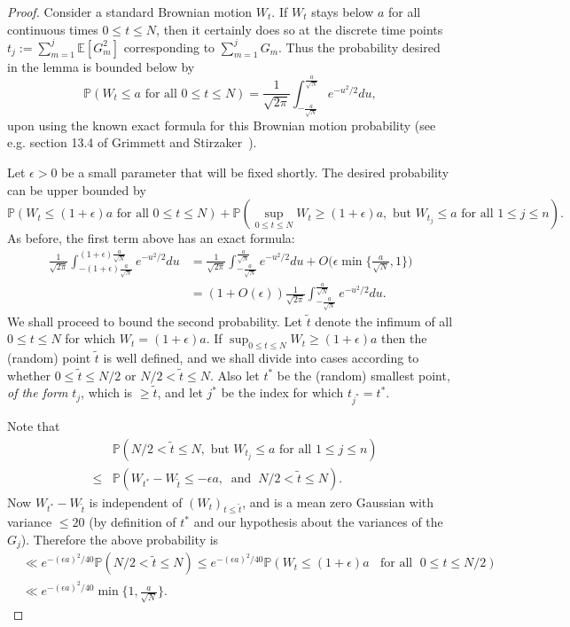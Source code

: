 \documentclass[12pt, notitlepage]{amsart}
\numberwithin{equation}{section}
\def\P{\mathbb P}
\def\E{\mathbb E}
\theoremstyle{remark}
\theoremstyle{definition}
\theoremstyle{remark}
\numberwithin{equation}{section}
\begin{document}
\begin{proof}  Consider a standard Brownian motion $W_t$.  If $W_t$ stays below $a$ for all continuous times $0\le t\le N$, then it certainly does so at the discrete time points $t_j := \sum_{m=1}^{j} \E [G_m^2]$ corresponding to $\sum_{m=1}^{j} G_m$.  Thus the probability desired in the lemma is bounded below by 
 $$
 \P(W_t \leq a  \text{  for all  } 0 \leq t \leq N) = \frac{1}{\sqrt{2\pi}} \int_{-\frac {a}{\sqrt{N}}}^{\frac{a}{\sqrt{N}}} e^{-u^{2}/2} du, 
 $$
upon using the known exact formula for this Brownian motion probability (see e.g. section 13.4 of Grimmett and Stirzaker~\cite{gs}). 


Let $\epsilon>0$ be a small parameter that will be fixed shortly.   The desired probability can be upper bounded by 
$$
 \P(W_t \leq (1+\epsilon)a \text{ for  all }  0 \leq t \leq N) + \P(\sup_{0 \leq t \leq N} W_t \geq (1+\epsilon)a, \text{  but  }  W_{t_j} \leq a \text{ for all } 1 \leq j \leq n). 
 $$ 
As before, the first term above has an exact formula: 
\begin{align*}
\frac{1}{\sqrt{2\pi}} \int_{-(1+\epsilon)\frac{a}{\sqrt{N}}}^{(1+\epsilon)\frac{a}{\sqrt{N}}} e^{-u^{2}/2} du & =  \frac{1}{\sqrt{2\pi}} \int_{-\frac{a}{\sqrt{N}}}^{\frac{a}{\sqrt{N}}} e^{-u^{2}/2} du + O\Big(\epsilon \min\Big\{ \frac{a}{\sqrt{N}}, 1\Big\} \Big) \\
& = (1 + O(\epsilon) ) \frac{1}{\sqrt{2\pi}} \int_{-\frac{a}{\sqrt{N}}}^{\frac{a}{\sqrt{N}}} e^{-u^{2}/2} du .  
\end{align*}
We shall proceed to bound the second probability. Let $\tilde{t}$ denote the infimum of all $0 \leq t \leq N$ for which $W_t = (1+\epsilon)a$. If $\sup_{0 \leq t \leq N} W_t \geq (1+\epsilon)a$ then the (random) point $\tilde{t}$ is well defined, and we shall divide into cases according to whether $0 \leq \tilde{t} \leq N/2$ or $N/2 < \tilde{t} \leq N$. Also let $t^{*}$ be the (random) smallest point, {\em of the form} $t_j$, which is $\geq \tilde{t}$, and let $j^{*}$ be the index for which $t_{j^{*}} = t^{*}$.

Note that 
\begin{eqnarray}
&& \P(N/2 < \tilde{t} \leq N , \text{  but  }  W_{t_j} \leq a \text{ for all } 1 \leq j \leq n) \nonumber \\
& \leq & \P(W_{t^{*}} - W_{\tilde{t}} \leq -\epsilon a,  \;\; \text{and} \;\; N/2 < \tilde{t} \leq N) . \nonumber
\end{eqnarray}
Now $W_{t^{*}} - W_{\tilde{t}}$ is independent of $(W_{t})_{t \leq \tilde{t}}$, and is a mean zero Gaussian with variance $\leq 20$ (by definition of $t^{*}$ and our hypothesis about the variances of the $G_j$). Therefore the above probability is 
\begin{align*} 
&\ll e^{-(\epsilon a)^{2}/40} \P(N/2 < \tilde{t} \leq N) \leq e^{-(\epsilon a)^{2}/40} \P(W_t \leq (1+\epsilon)a \;\; \text{  for all } \; 0 \leq t \leq N/2)\\
& \ll e^{-(\epsilon a)^{2}/40} \min\Big\{1, \frac{a}{\sqrt{N}}\Big\} . 
\end{align*}


\end{proof}
\end{document}
